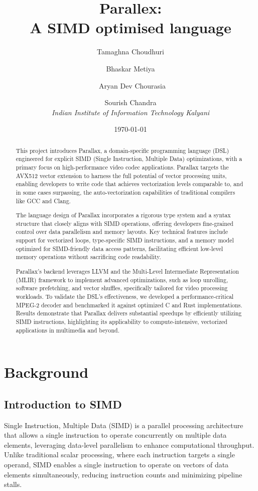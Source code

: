 \documentclass[12pt,a4paper]{article}
\title{Parallex:\\
       \large{A SIMD optimised language}}
\author{
    Tamaghna Choudhuri \and Bhaskar Metiya \and \
    Aryan Dev Chourasia \and Sourish Chandra \\
    \textit{Indian Institute of Information Technology Kalyani}
}
\date{\today}
\begin{document}
\maketitle

\begin{abstract}
This project introduces Parallax, a domain-specific programming language (DSL) engineered for explicit SIMD (Single Instruction, Multiple Data) optimizations, with a primary focus on high-performance video codec applications. Parallax targets the AVX512 vector extension to harness the full potential of vector processing units, enabling developers to write code that achieves vectorization levels comparable to, and in some cases surpassing, the auto-vectorization capabilities of traditional compilers like GCC and Clang.

The language design of Parallax incorporates a rigorous type system and a syntax structure that closely aligns with SIMD operations, offering developers fine-grained control over data parallelism and memory layouts. Key technical features include support for vectorized loops, type-specific SIMD instructions, and a memory model optimized for SIMD-friendly data access patterns, facilitating efficient low-level memory operations without sacrificing code readability.

Parallax’s backend leverages LLVM and the Multi-Level Intermediate Representation (MLIR) framework to implement advanced optimizations, such as loop unrolling, software prefetching, and vector shuffles, specifically tailored for video processing workloads. To validate the DSL’s effectiveness, we developed a performance-critical MPEG-2 decoder and benchmarked it against optimized C and Rust implementations. Results demonstrate that Parallax delivers substantial speedups by efficiently utilizing SIMD instructions, highlighting its applicability to compute-intensive, vectorized applications in multimedia and beyond.
\end{abstract}

\newpage
\tableofcontents
\newpage

\section{Background}

\subsection{Introduction to SIMD }
Single Instruction, Multiple Data (SIMD) is a parallel processing architecture that allows a single instruction to operate concurrently on multiple data elements, leveraging data-level parallelism to enhance computational throughput. Unlike traditional scalar processing, where each instruction targets a single operand, SIMD enables a single instruction to operate on vectors of data elements simultaneously, reducing instruction counts and minimizing pipeline stalls.
\end{document}
